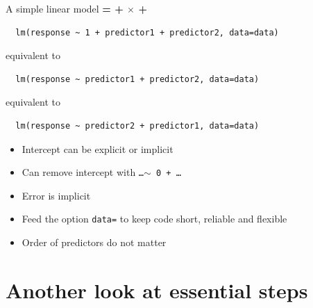 \documentclass[10pt]{beamer}
\makeatletter
\newenvironment{kframe}{%
 \def\at@end@of@kframe{}%
 \ifinner\ifhmode%
  \def\at@end@of@kframe{\end{minipage}}%
  \begin{minipage}{\columnwidth}%
 \fi\fi%
 \def\FrameCommand##1{\hskip\@totalleftmargin \hskip-\fboxsep
 \colorbox{shadecolor}{##1}\hskip-\fboxsep
     \hskip-\linewidth \hskip-\@totalleftmargin \hskip\columnwidth}%
 \MakeFramed {\advance\hsize-\width
   \@totalleftmargin\z@ \linewidth\hsize
   \@setminipage}}%
 {\par\unskip\endMakeFramed%
 \at@end@of@kframe}
\newenvironment{knitrout}{}{} %
\makeatother
\begin{document}
\begin{frame}[fragile]{A simple linear model}
  \textbf{{\color{purple}{Response}} = {\color{blue}{Intercept}} + {\color{red}{Slope}} $\times$ {\color{orange}{Predictor}} + {\color{gray}{Error}}} \\
  \vspace{-0.1cm}
  \begin{knitrout}
\color{fgcolor}\begin{kframe}
\footnotesize
\begin{verbatim}
  lm(response ~ 1 + predictor1 + predictor2, data=data)
\end{verbatim}
\end{kframe}
\end{knitrout}
equivalent to
  \begin{knitrout}
\color{fgcolor}\begin{kframe}
\footnotesize
\begin{verbatim}
  lm(response ~ predictor1 + predictor2, data=data) \end{verbatim}
\end{kframe}
\end{knitrout}
equivalent to
  \begin{knitrout}
\color{fgcolor}\begin{kframe}
\footnotesize
\begin{verbatim}
  lm(response ~ predictor2 + predictor1, data=data) \end{verbatim}
\end{kframe}
\end{knitrout}

\begin{itemize}
  \item Intercept can be explicit or implicit
  \item Can remove intercept with \texttt{\dots $\sim $ 0 + \dots}
  \item Error is implicit
  \item Feed the option \texttt{data=} to keep code short, reliable and flexible
  \item Order of predictors do not matter 
\end{itemize}

\end{frame}


\section{Another look at essential steps}
\end{document}
